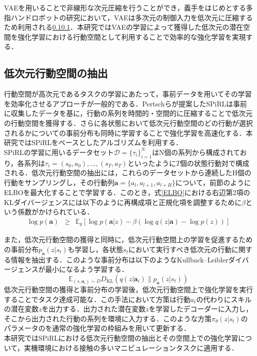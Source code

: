 \documentclass[dvipdfmx]{ampbt_nomag}
\begin{document}
VAEを用いることで非線形な次元圧縮を行うことができ，義手をはじめとする多指ハンドロボットの研究において，VAEは多次元の制御入力を低次元に圧縮するため利用される\ref{}\ref{}．本研究ではVAEの学習によって獲得した低次元の潜在空間を強化学習における行動空間として利用することで効率的な強化学習を実現する．




\subsection{低次元行動空間の抽出}

行動空間が高次元であるタスクの学習にあたって，事前データを用いてその学習を効率化させるアプローチが一般的である．Pertschらが提案したSPiRLは事前に収集したデータを基に，行動の系列を時間的・空間的に圧縮することで低次元の行動空間を獲得する．さらに各状態において低次元行動空間のどの行動が選択されるかについての事前分布も同時に学習することで強化学習を高速化する\cite{pertsch2021accelerating}．本研究ではSPiRLをベースとしたアルゴリズムを利用する．\\
SPiRLの学習に用いるデータセット$\mathcal{D}=\{\tau_i\}^{N}_{i=1}$はN個の系列から構成されており，各系列は$\tau_i = {(s_0, a_0), . . . ,(s_T, a_T)}$といったように$T$個の状態行動対で構成される．低次元行動空間の抽出には，これらのデータセットから連続したH個の行動をサンプリングし，その行動列$\boldsymbol{a}=\{a_l,a_{l+1},a_{l+H}\}$について，前節のようにELBOを最大化することで学習する．このとき，式\ref{ELBO}における右辺第2項のKLダイバージェンスには以下のように再構成項と正規化項を調整するために$\beta$という係数がかけられている．
\begin{eqnarray} 
  \label{SPiRL_ELBO}
  \log p(\boldsymbol{a}) &\geq& \mathbb{E}_q [\log p(\boldsymbol{a}|z)  -\beta(\log{q(z|\boldsymbol{a})} - \log{p(z)})]
  \end{eqnarray}



また，低次元行動空間の獲得と同時に，低次元行動空間上の学習を促進するための事前分布$p_{\boldsymbol{a}}(z|s_t)$も学習し，各状態$s_t$において実行すべき低次元の行動に関する情報を抽出する．このような事前分布は以下のようなKullback--Leiblerダイバージェンスが最小になるよう学習する．
\begin{equation}
  \mathbb{E}_{(s,\boldsymbol{a}_i)\sim D}D_\mathrm{KL}\left(q(z|\boldsymbol{a}_i)\|p_{\boldsymbol{a}}(z|s_t)\right)
\end{equation}
低次元行動空間の獲得と事前分布の学習後，低次元行動空間上で強化学習を実行することでタスク達成可能な．この手法において方策は行動$a_t$の代わりにスキルの潜在変数$z$を出力する．出力された潜在変数$z$を学習したデコーダーに入力し，そこから出力された行動の系列を環境に入力する．このような方策$\pi_\theta(z|s_t)$のパラメータのを通常の強化学習の枠組みを用いて更新する．\\
本研究ではSPiRLにおける低次元行動空間の抽出とその空間上での強化学習について，実機環境における接触の多いマニピュレーションタスクに適用する．
\end{document}
